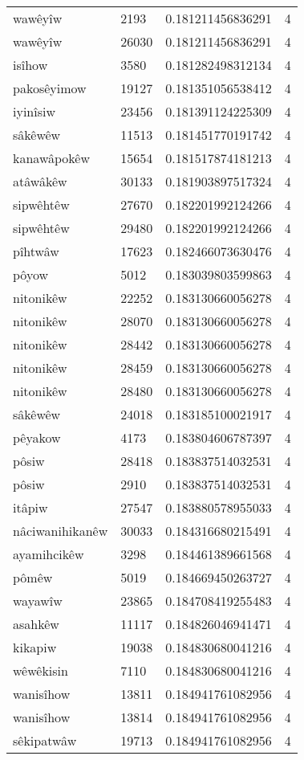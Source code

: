 \begin{longtable}{llll}
wawêyîw & 2193 & 0.181211456836291 & 4 \\
wawêyîw & 26030 & 0.181211456836291 & 4 \\
isîhow & 3580 & 0.181282498312134 & 4 \\
pakosêyimow & 19127 & 0.181351056538412 & 4 \\
iyinîsiw & 23456 & 0.181391124225309 & 4 \\
sâkêwêw & 11513 & 0.181451770191742 & 4 \\
kanawâpokêw & 15654 & 0.181517874181213 & 4 \\
atâwâkêw & 30133 & 0.181903897517324 & 4 \\
sipwêhtêw & 27670 & 0.182201992124266 & 4 \\
sipwêhtêw & 29480 & 0.182201992124266 & 4 \\
pîhtwâw & 17623 & 0.182466073630476 & 4 \\
pôyow & 5012 & 0.183039803599863 & 4 \\
nitonikêw & 22252 & 0.183130660056278 & 4 \\
nitonikêw & 28070 & 0.183130660056278 & 4 \\
nitonikêw & 28442 & 0.183130660056278 & 4 \\
nitonikêw & 28459 & 0.183130660056278 & 4 \\
nitonikêw & 28480 & 0.183130660056278 & 4 \\
sâkêwêw & 24018 & 0.183185100021917 & 4 \\
pêyakow & 4173 & 0.183804606787397 & 4 \\
pôsiw & 28418 & 0.183837514032531 & 4 \\
pôsiw & 2910 & 0.183837514032531 & 4 \\
itâpiw & 27547 & 0.183880578955033 & 4 \\
nâciwanihikanêw & 30033 & 0.184316680215491 & 4 \\
ayamihcikêw & 3298 & 0.184461389661568 & 4 \\
pômêw & 5019 & 0.184669450263727 & 4 \\
wayawîw & 23865 & 0.184708419255483 & 4 \\
asahkêw & 11117 & 0.184826046941471 & 4 \\
kikapiw & 19038 & 0.184830680041216 & 4 \\
wêwêkisin & 7110 & 0.184830680041216 & 4 \\
wanisîhow & 13811 & 0.184941761082956 & 4 \\
wanisîhow & 13814 & 0.184941761082956 & 4 \\
sêkipatwâw & 19713 & 0.184941761082956 & 4 \\

\end{longtable}
